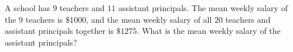 A school has $9$ teachers and $11$ assistant principals. The mean weekly salary of the $9$ teachers is $\$1000$, and the mean weekly salary of all $20$ teachers and assistant principals together is $\$1275$. What is the mean weekly salary of the assistant principals?
